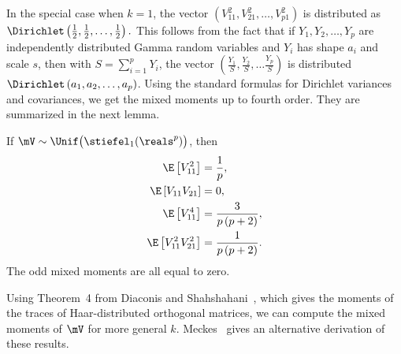 In the special case when $k = 1$, the vector
\(
    \left(
        V_{11}^2, V_{21}^2, \ldots, V_{p1}^2
    \right)
\)
is distributed as 
\(
    \Dirichlet\left( \frac{1}{2}, \frac{1}{2}, \ldots, \frac{1}{2} \right).
\)
This follows from the fact that if $Y_1, Y_2, \ldots, Y_p$ are independently distributed Gamma random variables and $Y_i$ has shape
$a_i$ and scale $s$, then with $S = \sum_{i=1}^p Y_i$, the vector
\(
    \left(
        \frac{Y_1}{S},
        \frac{Y_2}{S},
        \ldots
        \frac{Y_p}{S}
    \right)
\)
is distributed $\Dirichlet\left( a_1, a_2, \ldots, a_p \right)$.  Using
the standard formulas for Dirichlet variances and covariances, we get
the mixed moments up to fourth order.  They are summarized in the next
lemma.

\begin{lemma}\label{L:stiefel-1-moments}
    If $\mV \sim \Unif\big( \stiefel_1(\reals^p) \big)$, then
    \begin{subequations}
    \begin{align*}
        \E \left[ V_{11}^2 \right] 
            &= \frac{1}{p}, \\
        \E \left[ V_{11} V_{21} \right] 
            &= 0, \\
        \E \left[ V_{11}^4 \right] 
            &= \frac{3}{p \, (p + 2)}, \\
        \E \left[ V_{11}^2 V_{21}^2 \right] 
            &= \frac{1}{p \, (p + 2)}.
    \end{align*}
    \end{subequations}
    The odd mixed moments are all equal to zero.
\end{lemma}

Using Theorem~4 from Diaconis and Shahshahani~\cite{diaconis1994erm},
which gives the moments of the traces of Haar-distributed orthogonal
matrices, we can compute the mixed moments of $\mV$ for more general $k$.
Meckes~\cite{meckes2006ivs} gives an alternative derivation of these
results.

